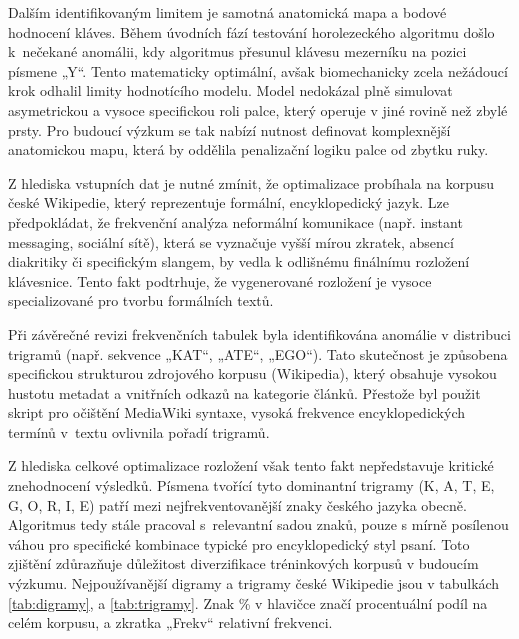 \documentclass[a4paper, twoside, 12pt, czech]{article}
\begin{document}
Dalším identifikovaným limitem je samotná anatomická mapa a bodové hodnocení kláves. 
Během úvodních fází testování horolezeckého algoritmu došlo k~ne\-čekané anomálii, kdy 
algoritmus přesunul klávesu mezerníku na pozici písmene „Y“. Tento matematicky 
optimální, avšak biomechanicky zcela nežádoucí krok odhalil limity hodnotícího 
modelu. Model nedokázal plně simulovat asymetrickou a vysoce specifickou roli 
palce, který operuje v jiné rovině než zbylé prsty. Pro budoucí výzkum se tak 
nabízí nutnost definovat komplexnější anatomickou mapu, která by 
oddělila penalizační logiku palce od zbytku ruky.

Z hlediska vstupních dat je nutné zmínit, že optimalizace probíhala na korpusu 
české Wikipedie, který reprezentuje formální, encyklopedický jazyk. Lze 
předpokládat, že frekvenční analýza neformální komunikace (např. instant messaging, 
sociální sítě), která se vyznačuje vyšší mírou zkratek, absencí diakritiky či 
specifickým slangem, by vedla k odlišnému finálnímu rozložení klávesnice. Tento 
fakt podtrhuje, že vygenerované rozložení je vysoce specializované pro tvorbu 
formálních textů. 

Při závěrečné revizi frekvenčních tabulek byla identifikována anomálie v distribuci 
trigramů (např. sekvence „KAT“, „ATE“, „EGO“). Tato skutečnost je způso\-bena 
specifickou strukturou zdrojového korpusu (Wikipedia), který obsahuje vysokou 
hustotu metadat a vnitřních odkazů na kategorie článků. Přestože byl použit 
skript pro očištění MediaWiki syntaxe, vysoká frekvence encyklopedických termí\-nů 
v~textu ovlivnila pořadí trigramů.

Z hlediska celkové optimalizace rozložení však tento fakt nepředstavuje kritické 
znehodnocení výsledků. Písmena tvořící tyto dominantní trigramy (K, A, T, E, G, O, R, I, E) 
patří mezi nejfrekventovanější znaky českého jazyka obecně. Algoritmus tedy stále 
pracoval s~relevantní sadou znaků, pouze s mírně posílenou váhou pro specifické 
kombinace typické pro encyklopedický styl psaní. Toto zjiště\-ní zdůrazňuje důležitost 
diverzifikace tréninkových korpusů v budoucím výzkumu. Nejpoužívanější digramy a trigramy
české Wikipedie jsou v tabulkách \ref{tab:digramy}, a \ref{tab:trigramy}. Znak 
\% v hlavičce značí procentuální podíl na celém korpusu, a zkratka „Frekv“ relativní 
frekvenci.
\end{document}
